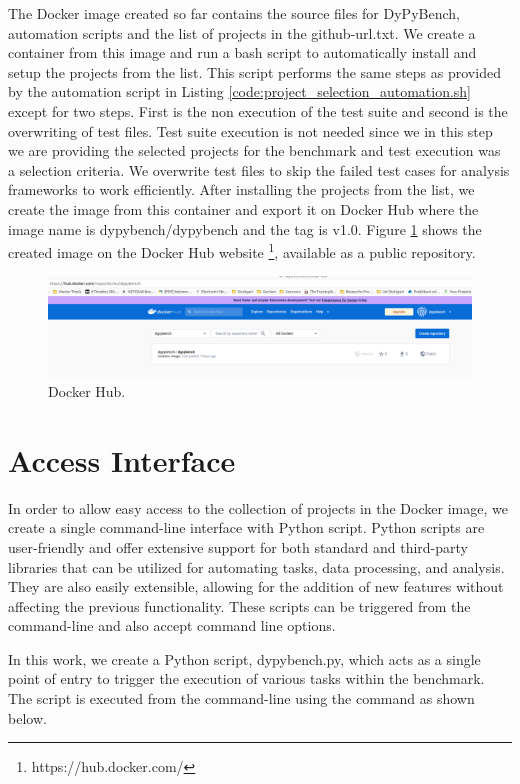 The Docker image created so far contains the source files for DyPyBench, automation scripts and the list of projects in the github-url.txt.
We create a container from this image and run a bash script to automatically install and setup the projects from the list.
This script performs the same steps as provided by the automation script in Listing \ref{code:project_selection_automation.sh} except for two steps.
First is the non execution of the test suite and second is the overwriting of test files.
Test suite execution is not needed since we in this step we are providing the selected projects for the benchmark and test execution was a selection criteria.
We overwrite test files to skip the failed test cases for analysis frameworks to work efficiently. 
After installing the projects from the list, we create the image from this container and export it on Docker Hub where the image name is dypybench/dypybench and the tag is v1.0.
Figure \ref{fig:dypybench docker} shows the created image on the Docker Hub website \footnote{https://hub.docker.com/}, available as a public repository.

\begin{figure}[ht]
\centering
\includegraphics[width=1\linewidth]{figures/implementation/docker_hub.png}
\caption[DyPyBench Docker Hub]{\label{fig:dypybench docker}Docker Hub.}
\end{figure}

\section{Access Interface}
\label{impl:Access Interface}
In order to allow easy access to the collection of projects in the Docker image, we create a single command-line interface with Python script.
Python scripts are user-friendly and offer extensive support for both standard and third-party libraries that can be utilized for automating tasks, data processing, and analysis.
They are also easily extensible, allowing for the addition of new features without affecting the previous functionality.
These scripts can be triggered from the command-line and also accept command line options.

In this work, we create a Python script, dypybench.py, which acts as a single point of entry to trigger the execution of various tasks within the benchmark.
The script is executed from the command-line using the command as shown below.


